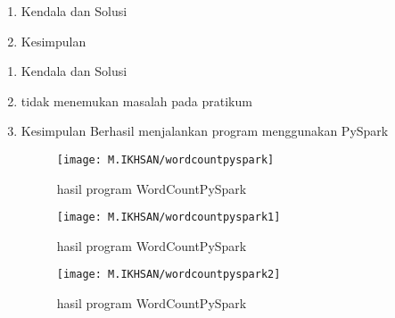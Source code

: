 \begin{enumerate}
\item Kendala dan Solusi

\item Kesimpulan

\end{enumerate}

\begin{enumerate}
\item Kendala dan Solusi
\item tidak menemukan masalah pada pratikum

\item Kesimpulan
Berhasil menjalankan program menggunakan PySpark

\begin{figure}[!ht]
    \texttt{[image: M.IKHSAN/wordcountpyspark]}
    \caption{hasil program WordCountPySpark }
    \label{gam:hasil instalasi spark}
    \end{figure}
\begin{figure}[!ht]
    \texttt{[image: M.IKHSAN/wordcountpyspark1]}
    \caption{hasil program WordCountPySpark }
    \label{gam:hasil instalasi spark}
    \end{figure}
\begin{figure}[!ht]
    \texttt{[image: M.IKHSAN/wordcountpyspark2]}
    \caption{hasil program WordCountPySpark }
    \label{gam:hasil instalasi spark}
    \end{figure}
\end{enumerate}
